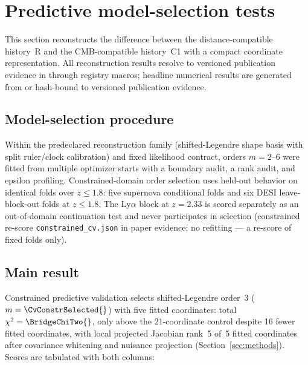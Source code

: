 \section{Predictive model-selection tests}
\label{sec:model-selection}

This section reconstructs the difference between the
distance-compatible history~R and the CMB-compatible history~C1 with
a compact coordinate representation. All reconstruction results resolve to
versioned publication evidence in  through
registry macros; headline numerical results are generated from or
hash-bound to versioned publication evidence.

\subsection{Model-selection procedure}

Within the predeclared reconstruction family (shifted-Legendre shape basis
with split ruler/clock calibration) and fixed likelihood contract,
orders $m=2$--$6$ were fitted from multiple optimizer starts with a
boundary audit, a rank audit, and epsilon profiling. Constrained-domain
order selection uses held-out behavior on identical folds over
$z\le1.8$: five supernova conditional folds and six DESI
leave-block-out folds at $z\le1.8$. The Ly$\alpha$ block at $z=2.33$
is scored separately as an out-of-domain continuation test and never
participates in selection
(constrained re-score \texttt{constrained\_cv.json} in paper
evidence;
no refitting — a re-score of fixed folds only).

\subsection{Main result}

Constrained predictive validation selects shifted-Legendre order~3
($m=\CvConstrSelected{}$) with five fitted coordinates: total
$\chi^{2}=\BridgeChiTwo{}$, only
\BridgeDeltaCtrl{} above the 21-coordinate control despite 16 fewer
fitted coordinates, with local projected Jacobian rank~5 of~5 fitted
coordinates after covariance whitening and nuisance projection
(Section~\ref{sec:methods}). Scores are tabulated with both columns:

\begin{table}[!htbp]
  \centering
  \caption{Constrained-domain held-out scores by order (selection
  column) with the Ly$\alpha$ continuation score alongside. The star
  marks the selected order under the predeclared smallest-$m$-within-2.0
  rule. Fixed folds, re-scored; no refitting.}
  \label{tab:constrained-cv}
  
\end{table}


